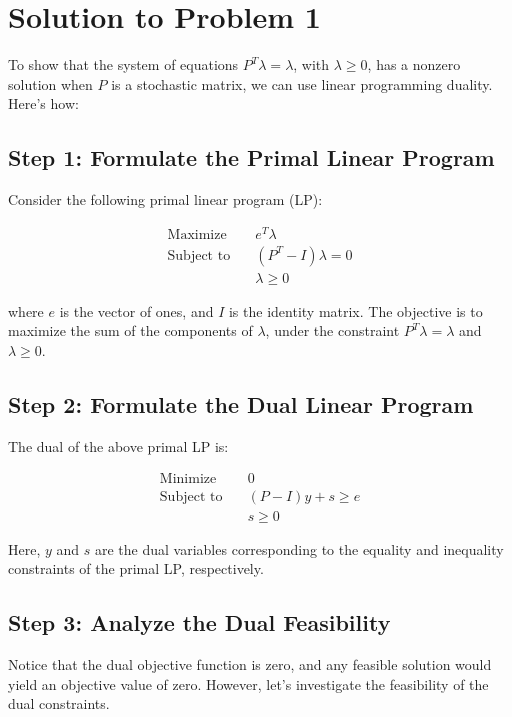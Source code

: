 \documentclass{article}
\begin{document}

\section{Solution to Problem 1}

To show that the system of equations $P^T \lambda = \lambda$, with $\lambda \geq 0$, has a nonzero solution when $P$ is a stochastic matrix, we can use linear programming duality. Here's how:

\subsection{Step 1: Formulate the Primal Linear Program}

Consider the following primal linear program (LP):

\begin{align*}
\text{Maximize} \quad & e^T \lambda \\
\text{Subject to} \quad & (P^T - I) \lambda = 0 \\
& \lambda \geq 0
\end{align*}

where $e$ is the vector of ones, and $I$ is the identity matrix. The objective is to maximize the sum of the components of $\lambda$, under the constraint $P^T \lambda = \lambda$ and $\lambda \geq 0$.

\subsection{Step 2: Formulate the Dual Linear Program}

The dual of the above primal LP is:

\begin{align*}
\text{Minimize} \quad & 0 \\
\text{Subject to} \quad & (P - I) y + s \geq e \\
& s \geq 0
\end{align*}

Here, $y$ and $s$ are the dual variables corresponding to the equality and inequality constraints of the primal LP, respectively.

\subsection{Step 3: Analyze the Dual Feasibility}

Notice that the dual objective function is zero, and any feasible solution would yield an objective value of zero. However, let's investigate the feasibility of the dual constraints.
\end{document}
